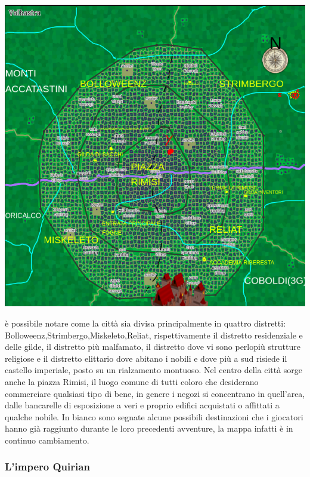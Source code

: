 \documentclass[a4paper,12pt]{book}
\begin{document}
\includegraphics[scale=0.9]{PiantinaValhastra.png}
\newpage

è possibile notare come la città sia divisa principalmente in quattro distretti: Bolloweenz,Strimbergo,Miskeleto,Reliat, rispettivamente il distretto residenziale e delle gilde, il distretto più malfamato, il distretto dove vi sono perlopiù strutture religiose e il distretto elittario dove abitano i nobili e dove più a sud risiede il castello imperiale, posto su un rialzamento montuoso.
Nel centro della città sorge anche la piazza Rimisi, il luogo comune di tutti coloro che desiderano commerciare qualsiasi tipo di bene, in genere i negozi si concentrano in quell'area, dalle bancarelle di esposizione a veri e proprio edifici acquistati o affittati a qualche nobile.
In bianco sono segnate alcune possibili destinazioni che i giocatori hanno già raggiunto durante le loro precedenti avventure, la mappa infatti è in continuo cambiamento.

\subsubsection{L'impero Quirian}
\end{document}
